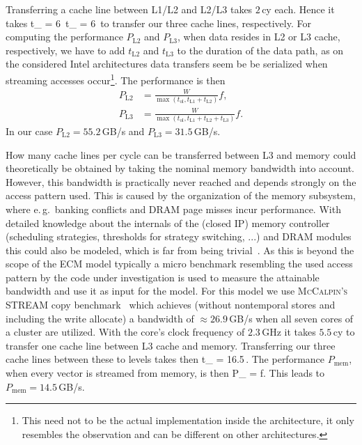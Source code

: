 {Transferring a cache line between L1/L2 and L2/L3 takes $2$\,cy each.
Hence it takes
%
\be
  t_ = 6\, \qquad {} \qquad t_ = 6\,
\ee
%
to transfer our three cache lines, respectively.
For computing the performance $P_\text{L2}$ and $P_\text{L3}$, when data resides
in L2 or L3 cache, respectively, we have to add $t_\text{L2}$ and $t_\text{L3}$
to the duration of the data path, as on the considered Intel architectures data
transfers seem be be serialized when streaming accesses occur\footnote{This need
not to be the actual implementation inside the architecture, it only resembles
the observation and can be different on other architectures.}.
The performance is then
%
\begin{align}
  P_\text{L2} &= \frac{W}{\max(t_\text{ol}, t_\text{L1} + t_\text{L2})} f, \\
  P_\text{L3} &= \frac{W}{\max(t_\text{ol}, t_\text{L1} + t_\text{L2} +
t_\text{L3})} f.
\end{align}
%
In our case $P_\text{L2} = 55.2$\,GB/s and $P_\text{L3} = 31.5$\,GB/s.
%

How many cache lines per cycle can be transferred between L3 and memory could
theoretically be obtained by taking the nominal memory bandwidth into account.
However, this bandwidth is practically never reached and depends strongly on the
access pattern used.
This is caused by the organization of the memory subsystem, where e.\,g.\ banking
conflicts and DRAM page misses incur performance.
With detailed knowledge about the internals of the (closed IP) memory controller
(scheduling strategies, thresholds for strategy switching, ...) and DRAM modules
this could also be modeled, which is far from being trivial~\cite{jacob-2007}.
As this is beyond the scope of the ECM model typically a micro benchmark
resembling the used access pattern by the code under investigation is used
to measure the attainable bandwidth and use it as input for the model.
%
For this model we use \textsc{McCalpin's} STREAM copy
benchmark~\cite{mccalpin-1995} which achieves (without nontemporal stores and
including the write allocate) a bandwidth of $\approx 26.9$\,GB/s when all seven cores
of a cluster are utilized.
With the core's clock frequency of $2.3$\,GHz it takes $5.5$\,cy to transfer one
cache line between L3 cache and memory.
Transferring our three cache lines between these to levels takes then
%
\be
  t_ = 16.5\,.
\ee
%
The performance $P_\text{mem}$, when every vector is streamed from memory, is then
%
\be
  P_ =  f.
\ee
%
This leads to $P_\text{mem} = 14.5$\,GB/s. 

}
